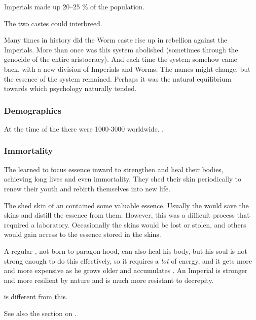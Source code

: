 Imperials made up 20--25 \% of the \ophidian population.

The two castes could interbreed.

Many times in \ophidian history did the Worm caste rise up in rebellion against the Imperials.
More than once was this system abolished (sometimes through the genocide of the entire aristocracy).
And each time the system somehow came back, with a new division of Imperials and Worms. 
The names might change, but the essence of the system remained.
Perhaps it was the natural equilibrium towards which \ophidian psychology naturally tended.





\subsubsection{Demographics}
At the time of the \thirdbanewar there were 1000-3000 \ophidians worldwide. 
.





\subsubsection{Immortality}
The \ophidian {} learned to focus \nexus essence inward to strengthen and heal their bodies, achieving long lives and even immortality. 
They shed their skin periodically to renew their youth and rebirth themselves into new life. 

The shed skin of an \ophidian{} contained some valuable essence. 
Usually the \ophidians would save the skins and distill the essence from them. 
However, this was a difficult process that required a laboratory. 
Occasionally the skins would be lost or stolen, and others would gain access to the essence stored in the skins. 

A regular \ophidian, not born to paragon-hood, can also heal his body, but his soul is not strong enough to do this effectively, so it requires a \emph{lot} of energy, and it gets more and more expensive as he grows older and accumulates . 
An Imperial is stronger and more resilient by nature and is much more resistant to decrepity. 

 is different from this. 

See also the section on . 

